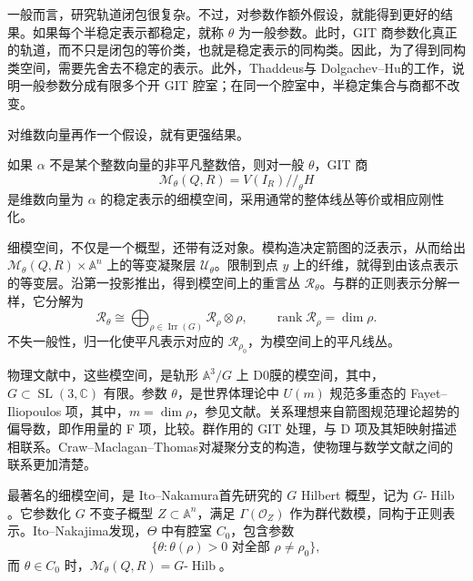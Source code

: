 一般而言，研究轨道闭包很复杂。不过，对参数作额外假设，就能得到更好的结果。如果每个半稳定表示都稳定，就称 $\theta$ 为一般参数。此时，GIT 商参数化真正的轨道，而不只是闭包的等价类，也就是稳定表示的同构类。因此，为了得到同构类空间，需要先舍去不稳定的表示。此外，Thaddeus与 Dolgachev--Hu的工作，说明一般参数分成有限多个开 GIT 腔室；在同一个腔室中，半稳定集合与商都不改变。

对维数向量再作一个假设，就有更强结果。
\begin{theorem}\label{thm:4.88}
如果 $\alpha$ 不是某个整数向量的非平凡整数倍，则对一般 $\theta$，GIT 商
\[
\mathcal{M}_\theta(Q,R)=V(I_R)\mathbin{//}_\theta H
\]
是维数向量为 $\alpha$ 的稳定表示的细模空间，采用通常的整体线丛等价或相应刚性化。
\end{theorem}

细模空间，不仅是一个概型，还带有泛对象。模构造决定箭图的泛表示，从而给出 $\mathcal{M}_\theta(Q,R)\times\mathbb{A}^n$ 上的等变凝聚层 $\mathcal{U}_\theta$。限制到点 $y$ 上的纤维，就得到由该点表示的等变层。沿第一投影推出，得到模空间上的重言丛 $\mathcal{R}_\theta$。与群的正则表示分解一样，它分解为
\begin{equation}\label{eq:4.12}
\mathcal{R}_\theta
\cong\bigoplus_{\rho\in\operatorname{Irr}(G)}
\mathcal{R}_\rho\otimes\rho,
\qquad\operatorname{rank}\mathcal{R}_\rho=\dim\rho.
\end{equation}
不失一般性，归一化使平凡表示对应的 $\mathcal{R}_{\rho_0}$，为模空间上的平凡线丛。

\begin{note}[89]\label{note:4.89}
物理文献中，这些模空间，是轨形 $\mathbb{A}^3/G$ 上 D0膜的模空间，其中，$G\subset\operatorname{SL}(3,\mathbb{C})$ 有限。参数 $\theta$，是世界体理论中 $U(m)$ 规范多重态的 Fayet--Iliopoulos 项，其中，$m=\dim\rho$，参见文献。关系理想来自箭图规范理论超势的偏导数，即作用量的 F 项，比较。群作用的 GIT 处理，与 D 项及其矩映射描述相联系。Craw--Maclagan--Thomas对凝聚分支的构造，使物理与数学文献之间的联系更加清楚。
\end{note}

\begin{example}\label{ex:4.90}
最著名的细模空间，是 Ito--Nakamura首先研究的 $G$ Hilbert 概型，记为 $G\text{-}\operatorname{Hilb}$。它参数化 $G$ 不变子概型 $Z\subset\mathbb{A}^n$，满足 $\Gamma(\mathcal{O}_Z)$ 作为群代数模，同构于正则表示。Ito--Nakajima发现，$\Theta$ 中有腔室 $C_0$，包含参数
\[
\{\theta:\theta(\rho)>0\text{ 对全部 }\rho\ne\rho_0\},
\]
而 $\theta\in C_0$ 时，$\mathcal{M}_\theta(Q,R)=G\text{-}\operatorname{Hilb}$。
\end{example}

